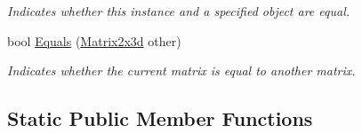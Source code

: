 \begin{DoxyCompactItemize}
\begin{DoxyCompactList}\small\item\em Indicates whether this instance and a specified object are equal. \end{DoxyCompactList}\item 
bool \hyperlink{struct_open_t_k_1_1_matrix2x3d_a1c56a7a1923e5898300a895d5d7b2696}{Equals} (\hyperlink{struct_open_t_k_1_1_matrix2x3d}{Matrix2x3d} other)
\begin{DoxyCompactList}\small\item\em Indicates whether the current matrix is equal to another matrix. \end{DoxyCompactList}\end{DoxyCompactItemize}
\subsection*{Static Public Member Functions}
